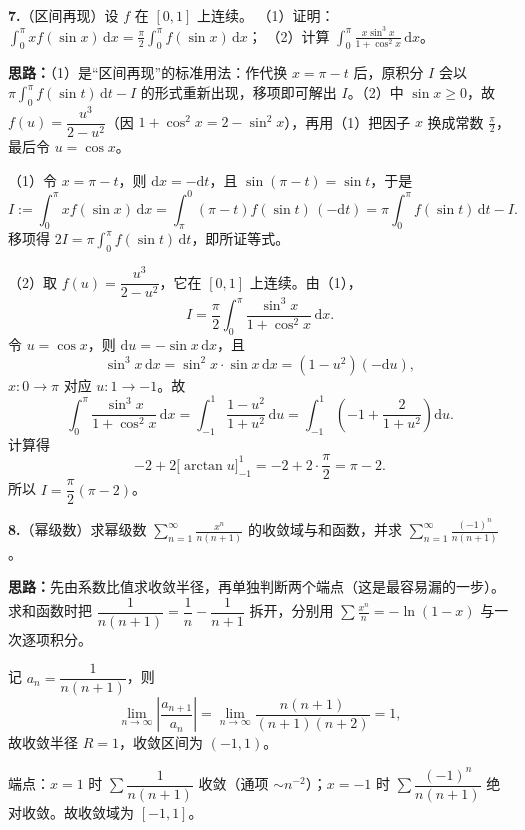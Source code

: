 
\else \answerarea[8] \fi%
\textbf{7.}（区间再现）设 $f$ 在 $[0,1]$ 上连续。
（1）证明：$\displaystyle\int_{0}^{\pi}x f(\sin x)\,\mathrm{d}x=\frac{\pi}{2}\int_{0}^{\pi}f(\sin x)\,\mathrm{d}x$；
（2）计算 $\displaystyle\int_{0}^{\pi}\frac{x\sin^{3}x}{1+\cos^{2}x}\,\mathrm{d}x$。

\ifshowsolutions%
\textbf{思路：}（1）是“区间再现”的标准用法：作代换 $x=\pi-t$ 后，原积分 $I$ 会以 $\pi\int_{0}^{\pi}f(\sin t)\,\mathrm{d}t-I$ 的形式重新出现，移项即可解出 $I$。（2）中 $\sin x\ge0$，故 $f(u)=\dfrac{u^{3}}{2-u^{2}}$（因 $1+\cos^{2}x=2-\sin^{2}x$），再用（1）把因子 $x$ 换成常数 $\frac{\pi}{2}$，最后令 $u=\cos x$。

（1）令 $x=\pi-t$，则 $\mathrm{d}x=-\mathrm{d}t$，且 $\sin(\pi-t)=\sin t$，于是
\[
I:=\int_{0}^{\pi}x f(\sin x)\,\mathrm{d}x
=\int_{\pi}^{0}(\pi-t)f(\sin t)\,(-\mathrm{d}t)
=\pi\int_{0}^{\pi}f(\sin t)\,\mathrm{d}t-I.
\]
移项得 $2I=\pi\displaystyle\int_{0}^{\pi}f(\sin t)\,\mathrm{d}t$，即所证等式。

（2）取 $f(u)=\dfrac{u^{3}}{2-u^{2}}$，它在 $[0,1]$ 上连续。由（1），
\[
I=\frac{\pi}{2}\int_{0}^{\pi}\frac{\sin^{3}x}{1+\cos^{2}x}\,\mathrm{d}x.
\]
令 $u=\cos x$，则 $\mathrm{d}u=-\sin x\,\mathrm{d}x$，且
\[
\sin^{3}x\,\mathrm{d}x=\sin^{2}x\cdot\sin x\,\mathrm{d}x=(1-u^{2})(-\mathrm{d}u),
\]
$x:0\to\pi$ 对应 $u:1\to-1$。故
\[
\int_{0}^{\pi}\frac{\sin^{3}x}{1+\cos^{2}x}\,\mathrm{d}x
=\int_{-1}^{1}\frac{1-u^{2}}{1+u^{2}}\,\mathrm{d}u
=\int_{-1}^{1}\left(-1+\frac{2}{1+u^{2}}\right)\mathrm{d}u.
\]
计算得
\[
-2+2\bigl[\arctan u\bigr]_{-1}^{1}
=-2+2\cdot\frac{\pi}{2}=\pi-2.
\]
所以 $I=\dfrac{\pi}{2}(\pi-2)$。


\else \answerarea[8] \fi%
\textbf{8.}（幂级数）求幂级数 $\displaystyle\sum_{n=1}^{\infty}\frac{x^{n}}{n(n+1)}$ 的收敛域与和函数，并求 $\displaystyle\sum_{n=1}^{\infty}\frac{(-1)^{n}}{n(n+1)}$。

\ifshowsolutions%
\textbf{思路：}先由系数比值求收敛半径，再单独判断两个端点（这是最容易漏的一步）。求和函数时把 $\dfrac{1}{n(n+1)}=\dfrac{1}{n}-\dfrac{1}{n+1}$ 拆开，分别用 $\sum\frac{x^{n}}{n}=-\ln(1-x)$ 与一次逐项积分。

记 $a_{n}=\dfrac{1}{n(n+1)}$，则
\[
\lim_{n\to\infty}\left|\frac{a_{n+1}}{a_{n}}\right|
=\lim_{n\to\infty}\frac{n(n+1)}{(n+1)(n+2)}=1,
\]
故收敛半径 $R=1$，收敛区间为 $(-1,1)$。

端点：$x=1$ 时 $\sum\dfrac{1}{n(n+1)}$ 收敛（通项 $\sim n^{-2}$）；$x=-1$ 时 $\sum\dfrac{(-1)^{n}}{n(n+1)}$ 绝对收敛。故收敛域为 $[-1,1]$。

